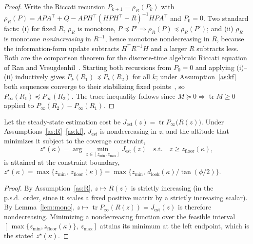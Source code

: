\begin{proof}
Write the Riccati recursion $P_{k+1}=\rho_R(P_k)$ with
$\rho_R(P)=A P A^{\!\top}+Q-APH^{\!\top}(HPH^{\!\top}+R)^{-1}HPA^{\!\top}$ and
$P_0=0$. Two standard facts: (i) for fixed $R$, $\rho_R$ is monotone,
$P\preceq P'\Rightarrow\rho_R(P)\preceq\rho_R(P')$; and (ii) $\rho_R$ is monotone
\emph{nonincreasing} in $R^{-1}$, hence monotone nondecreasing in $R$, because the
information-form update subtracts $H^{\!\top}R^{-1}H$ and a larger $R$ subtracts
less. Both are the comparison theorem for the discrete-time algebraic Riccati
equation of Ran and Vreugdenhil~\cite{ranvreugdenhil1988}. Starting both
recursions from $P_0=0$ and applying (i)–(ii) inductively gives
$P_k(R_1)\preceq P_k(R_2)$ for all $k$; under Assumption~\ref{as:kf} both
sequences converge to their stabilizing fixed points~\cite{andersonmoore1979},
so $P_\infty(R_1)\preceq P_\infty(R_2)$. The trace inequality follows since
$M\succeq0\Rightarrow\operatorname{tr}M\ge0$ applied to
$P_\infty(R_2)-P_\infty(R_1)$.
\end{proof}

\begin{proposition}\label{prop:alt}
Let the steady-state estimation cost be $J_{\mathrm{est}}(z)=\operatorname{tr}
P_\infty\!\big(R(z)\big)$. Under Assumptions~\ref{as:R}--\ref{as:kf}, $J_{\mathrm{est}}$
is nondecreasing in $z$, and the altitude that minimizes it subject to the coverage
constraint,
\begin{equation}
z^\star(\kappa)=\arg\min_{z\in[z_{\min},z_{\max}]} J_{\mathrm{est}}(z)
\quad\text{s.t.}\quad z\ge z_{\mathrm{floor}}(\kappa),
\label{eq:altopt}
\end{equation}
is attained at the constraint boundary,
$z^\star(\kappa)=\max\{z_{\min},\,z_{\mathrm{floor}}(\kappa)\}
=\max\{z_{\min},\,d_{\mathrm{look}}(\kappa)/\tan(\phi/2)\}$.
\end{proposition}

\begin{proof}
By Assumption~\ref{as:R}, $z\mapsto R(z)$ is strictly increasing (in the p.s.d.\
order, since it scales a fixed positive matrix by a strictly increasing scalar).
By Lemma~\ref{lem:mono}, $z\mapsto\operatorname{tr}P_\infty(R(z))=J_{\mathrm{est}}(z)$
is therefore nondecreasing. Minimizing a nondecreasing function over the feasible
interval $[\,\max\{z_{\min},z_{\mathrm{floor}}(\kappa)\},\,z_{\max}]$ attains its
minimum at the left endpoint, which is the stated $z^\star(\kappa)$.
\end{proof}

